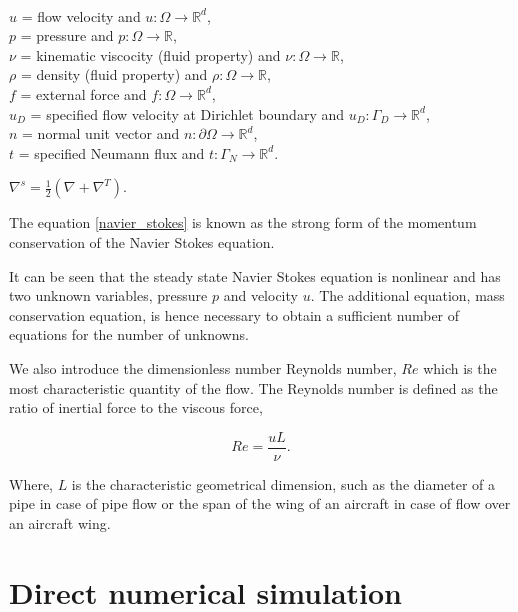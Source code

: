 \documentclass[a4paper,oneside,openright,spanish,english]{book}
\begin{document}
$ $\\
$u$ = flow velocity and $u:\Omega \rightarrow \mathbb{R}^d$,\\
$p$ = pressure and $p:\Omega \rightarrow \mathbb{R}$,\\
$\nu$ = kinematic viscocity (fluid property) and $\nu:\Omega \rightarrow \mathbb{R}$,\\ 
$\rho$ = density (fluid property) and $\rho:\Omega \rightarrow \mathbb{R}$,\\
$f$ = external force and $f:\Omega \rightarrow \mathbb{R}^d$,\\
$u_D$ = specified flow velocity at Dirichlet boundary and $u_D:\Gamma_D \rightarrow \mathbb{R}^d$,\\
$n$ = normal unit vector and $n:\partial \Omega \rightarrow \mathbb{R}^d$,\\
$t$ = specified Neumann flux and $t:\Gamma_N \rightarrow \mathbb{R}^d$.\\

\begin{center}
$\nabla^s = \frac{1}{2}(\nabla + \nabla^T) \textrm{.}$
\end{center}

The equation \eqref{navier_stokes} is known as the strong form of the momentum conservation of the Navier Stokes equation.

It can be seen that the steady state Navier Stokes equation is nonlinear and has two unknown variables, pressure $p$ and velocity $u$. The additional equation, mass conservation equation, is hence necessary to obtain a sufficient number of equations for the number of unknowns.

We also introduce the dimensionless number Reynolds number, $Re$ which is the most characteristic quantity of the flow. The Reynolds number is defined as the ratio of inertial force to the viscous force,

\begin{equation} \label{reynolds_number}
Re = \frac{uL}{\nu} \textrm{.}
\end{equation}

Where, $L$ is the characteristic geometrical dimension, such as the diameter of a pipe in case of pipe flow or the span of the wing of an aircraft in case of flow over an aircraft wing.\\

\section{Direct numerical simulation} 
\end{document}
